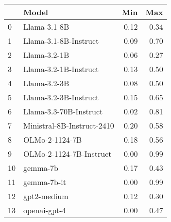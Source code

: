 \begin{tabular}{llrr}
\toprule
 & Model & Min & Max \\
\midrule
0 & Llama-3.1-8B & 0.12 & 0.34 \\
1 & Llama-3.1-8B-Instruct & 0.09 & 0.70 \\
2 & Llama-3.2-1B & 0.06 & 0.27 \\
3 & Llama-3.2-1B-Instruct & 0.13 & 0.50 \\
4 & Llama-3.2-3B & 0.08 & 0.50 \\
5 & Llama-3.2-3B-Instruct & 0.15 & 0.65 \\
6 & Llama-3.3-70B-Instruct & 0.02 & 0.81 \\
7 & Ministral-8B-Instruct-2410 & 0.20 & 0.58 \\
8 & OLMo-2-1124-7B & 0.18 & 0.56 \\
9 & OLMo-2-1124-7B-Instruct & 0.00 & 0.99 \\
10 & gemma-7b & 0.17 & 0.43 \\
11 & gemma-7b-it & 0.00 & 0.99 \\
12 & gpt2-medium & 0.12 & 0.30 \\
13 & openai-gpt-4 & 0.00 & 0.47 \\
\bottomrule
\end{tabular}
